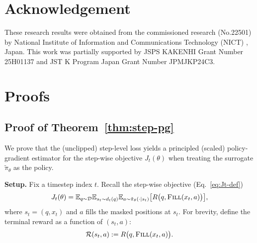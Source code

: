 \documentclass{article}
\theoremstyle{plain}
\theoremstyle{definition}
\theoremstyle{remark}
\begin{document}
\section*{Acknowledgement}
These research results were obtained from the commissioned research (No.22501) by National Institute of Information and Communications Technology (NICT) , Japan.
This work was partially supported by JSPS KAKENHI Grant Number 25H01137 and JST K Program Japan Grant Number JPMJKP24C3.





\newpage
\appendix
\onecolumn
\section{Proofs}\label{app:proofs}

\subsection{Proof of Theorem~\ref{thm:step-pg}}
\label{app:proof-step-pg}

We prove that the (unclipped) step-level loss yields a principled (scaled) policy-gradient estimator for the step-wise objective $J_t(\theta)$ when treating the surrogate $\tilde{\pi}_\theta$ as the policy.


\textbf{Setup.}
Fix a timestep index $t$. Recall the step-wise objective (Eq.~\ref{eq:Jt-def})
\[
  J_t(\theta)
  =
  \mathbb{E}_{q \sim \mathcal{D}}
  \mathbb{E}_{s_t \sim d_t(q)}
  \mathbb{E}_{a \sim \tilde{\pi}_\theta(\cdot \mid s_t)}
  \bigl[ R\bigl(q,\textsc{Fill}(x_t,a)\bigr) \bigr],
\]
where $s_t=(q,x_t)$ and $a$ fills the masked positions at $s_t$.
For brevity, define the terminal reward as a function of $(s_t,a)$:
\[
  \mathcal{R}(s_t,a) := R\bigl(q,\textsc{Fill}(x_t,a)\bigr).
\]
\end{document}
